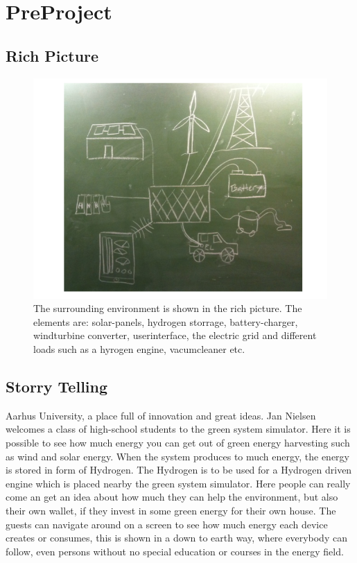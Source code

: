 \section{PreProject}
\subsection{Rich Picture}

\begin{figure}[h!]		%
 \begin{center}
  \includegraphics[width=1\textwidth]{images/rich_picture.png}
   \caption{The surrounding environment is shown in the rich picture. The
 			 elements are: solar-panels, hydrogen storrage, battery-charger, windturbine
 			 converter, userinterface, the electric grid and different loads such as a
 			 hyrogen engine, vacumcleaner etc. }
 \end{center}
\end{figure}

\subsection{Storry Telling}
Aarhus University, a place full of innovation and great ideas. Jan Nielsen
welcomes a class of high-school students to the green system simulator. Here it
is possible to see how much energy you can get out of green energy harvesting
such as wind and solar energy. When the system produces to much energy, the 
energy is stored in form of Hydrogen. The Hydrogen is to be used for a Hydrogen
driven engine which is placed nearby the green system simulator. Here people can
really come an get an idea about how much they can help the environment, but
also their own wallet, if they invest in some green energy for their own house.
The guests can navigate around on a screen to see how much energy each device 
creates or consumes, this is shown in a down to earth way, where everybody can follow, 
even persons without no special education or courses in the energy field.
